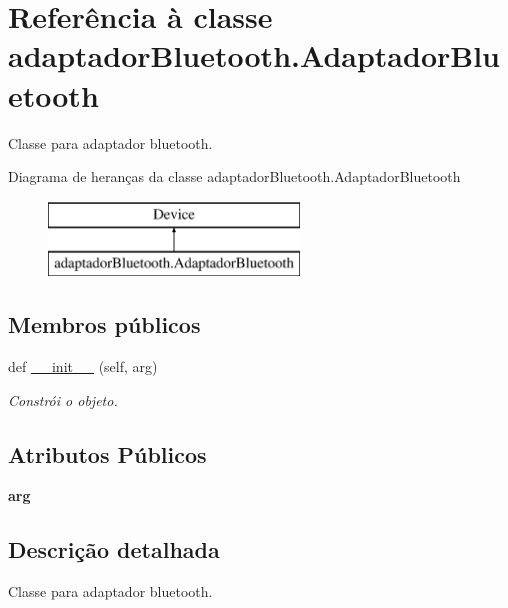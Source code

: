 \hypertarget{classadaptador_bluetooth_1_1_adaptador_bluetooth}{}\section{Referência à classe adaptador\+Bluetooth.\+Adaptador\+Bluetooth}
\label{classadaptador_bluetooth_1_1_adaptador_bluetooth}


Classe para adaptador bluetooth.  


Diagrama de heranças da classe adaptador\+Bluetooth.\+Adaptador\+Bluetooth\begin{figure}[H]
\begin{center}
\leavevmode
\includegraphics[height=2.000000cm]{classadaptador_bluetooth_1_1_adaptador_bluetooth}
\end{center}
\end{figure}
\subsection*{Membros públicos}
\begin{DoxyCompactItemize}
\item 
def \hyperlink{classadaptador_bluetooth_1_1_adaptador_bluetooth_a11e812b23e047752d56486e4b327077d}{\+\_\+\+\_\+init\+\_\+\+\_\+} (self, arg)
\begin{DoxyCompactList}\small\item\em Constrói o objeto. \end{DoxyCompactList}\end{DoxyCompactItemize}
\subsection*{Atributos Públicos}
\begin{DoxyCompactItemize}
\item 
{\bfseries arg}\hypertarget{classadaptador_bluetooth_1_1_adaptador_bluetooth_aa9722fd9312eed3e2a3143d3a594aa9f}{}\label{classadaptador_bluetooth_1_1_adaptador_bluetooth_aa9722fd9312eed3e2a3143d3a594aa9f}

\end{DoxyCompactItemize}


\subsection{Descrição detalhada}
Classe para adaptador bluetooth. 

